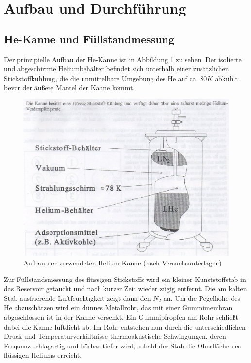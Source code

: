 \section{Aufbau und Durchführung} %
\label{sec:aufbau_und_durchf_hrung}


	\subsection{He-Kanne und Füllstandmessung} %
	\label{sub:f_llstandmessung}
	
		Der prinzipielle Aufbau der He-Kanne ist in Abbildung \ref{hecan} zu sehen. 
		Der isolierte und abgeschirmte Heliumbehälter befindet sich unterhalb einer zusätzlichen Stickstoffkühlung, die die unmittelbare Umgebung des He auf ca. $80 \unit{K}$ abkühlt bevor der äußere Mantel der Kanne kommt.
		\begin{figure}[H]
			\center
			\includegraphics[scale=0.7]{messwerte/hecan.jpg}
			\caption{Aufbau der verwendeten Helium-Kanne (nach Versuchsunterlagen)}
			\label{hecan}
		\end{figure}
		Zur Füllstandsmessung des flüssigen Stickstoffs wird ein kleiner Kunststoffstab in das Reservoir getaucht und nach kurzer Zeit wieder zügig entfernt. 
		Die am kalten Stab ausfrierende Luftfeuchtigkeit zeigt dann den $N_2$ an.
		Um die Pegelhöhe des He abzuschätzen wird ein dünnes Metallrohr, das mit einer Gummimembran abgeschlossen ist in der Kanne versenkt.
		Ein Gummipfropfen am Rohr schließt dabei die Kanne luftdicht ab.
		Im Rohr entstehen nun durch die unterschiedlichen Druck und Temperaturverhältnisse thermoakustische Schwingungen, deren Frequenz schlagartig und hörbar tiefer wird, sobald der Stab die Oberfläche des flüssigen Heliums erreicht.

